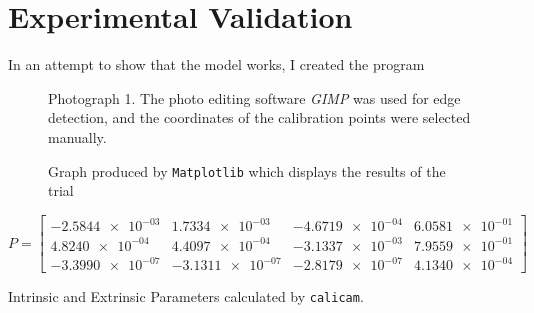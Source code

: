 \section{Experimental Validation}

In an attempt to show that the model works, I created the program

\begin{figure}[H]
    \centering
    \caption{Photograph 1. The photo editing software \emph{GIMP} was used for edge detection, and the coordinates of the calibration points were selected manually. }
\end{figure}



\begin{figure}[H]
    \centering
    \caption{Graph produced by \texttt{Matplotlib} which displays the results of the trial}
\end{figure}

\begin{equation*}
    P =
    \begin{bmatrix}
        \num{-2.5844e-03} & \num{1.7334e-03}  & \num{-4.6719e-04} & \num{6.0581e-01} \\
        \num{4.8240e-04}  & \num{4.4097e-04}  & \num{-3.1337e-03} & \num{7.9559e-01} \\
        \num{-3.3990e-07} & \num{-3.1311e-07} & \num{-2.8179e-07} & \num{4.1340e-04}
    \end{bmatrix}
\end{equation*}

\begin{table}
     
    \caption{Intrinsic and Extrinsic Parameters calculated by \texttt{calicam}.}
\end{table}


